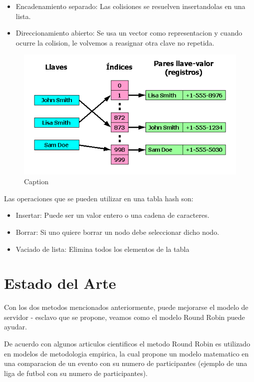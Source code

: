 \documentclass[conference,letterpaper]{IEEEtran}
\begin{document}
\begin{itemize}
    \item Encadenamiento separado: Las colisiones se resuelven insertandolas en una lista.
    \item Direccionamiento abierto: Se usa un vector como representacion y cuando ocurre la colision, le volvemos a reasignar otra clave no repetida.
\end{itemize}

\begin{figure}[thpb]
    \centering
    \includegraphics[width=0.55\linewidth]{Tabla_hash1.png}
    \caption{Caption}
    \label{fig:hash}
\end{figure}

Las operaciones que se pueden utilizar en una tabla hash son:
\begin{itemize}
    \item Insertar: Puede ser un valor entero o una cadena de caracteres.
    \item Borrar: Si uno quiere borrar un nodo debe seleccionar dicho nodo.
    \item Vaciado de lista: Elimina todos los elementos de la tabla
\end{itemize}

\section{Estado del Arte}
Con los dos metodos mencionados anteriormente, puede mejorarse el modelo de servidor - esclavo que se propone, veamos como el modelo Round Robin puede ayudar.

De acuerdo con algunos articulos cientificos el metodo Round Robin es utilizado en modelos de metodologia empirica, la cual propone un modelo matematico en una comparacion de un evento con su numero de participantes (ejemplo de una liga de futbol con su numero de participantes).
\end{document}
